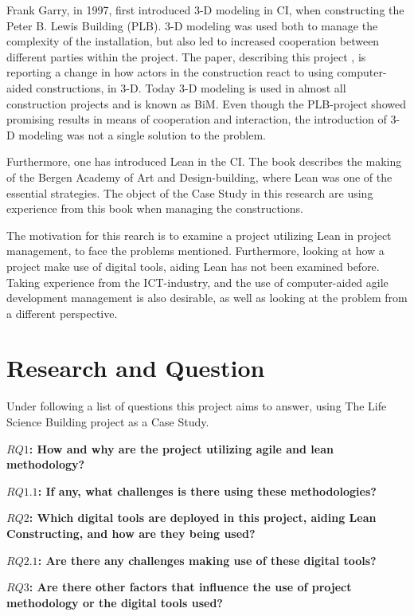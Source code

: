 Frank Garry, in 1997, first introduced 3-D modeling in CI, when constructing the Peter B. Lewis Building (PLB). 3-D modeling was used both to manage the complexity of the installation, but also led to increased cooperation between different parties within the project. The paper, describing this project \cite{frank_garry}, is reporting a change in how actors in the construction react to using computer-aided constructions, in 3-D. Today 3-D modeling is used in almost all construction projects and is known as BiM. Even though the PLB-project showed promising results in means of cooperation and interaction, the introduction of 3-D modeling was not a single solution to the problem.

Furthermore, one has introduced Lean in the CI. The book \cite{lean_i_praksis} describes the making of the Bergen Academy of Art and Design-building, where Lean was one of the essential strategies. The object of the Case Study in this research are using experience from this book when managing the constructions. 

The motivation for this rearch is to examine a project utilizing Lean in project management, to face the problems mentioned. Furthermore, looking at how a project make use of digital tools, aiding Lean has not been examined before. Taking experience from the ICT-industry, and the use of computer-aided agile development management is also desirable, as well as looking at the problem from a different perspective.

\section{Research and Question} \label{sec:research}
Under following a list of questions this project aims to answer, using The Life Science Building project as a Case Study.

{\noindent \bf $RQ1$: How and why are the project utilizing agile and lean methodology?}

{\indent \bf $RQ1.1$: If any, what challenges is there using these methodologies?}

{\noindent \bf $RQ2$: Which digital tools are deployed in this project, aiding Lean Constructing, and how are they being used?}

{\indent \bf $RQ2.1$: Are there any challenges making use of these digital tools?}

{\noindent \bf $RQ3$: Are there other factors that influence the use of project methodology or the digital tools used?}

